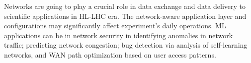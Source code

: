 Networks are going to play a crucial role in data exchange and data delivery to scientific applications in HL-LHC era. The network-aware application layer and configurations may significantly affect experiment's daily operations. ML applications can be in network security in identifying anomalies in network traffic; predicting network congestion; bug detection via analysis of self-learning networks, and WAN path optimization based on user access patterns.







